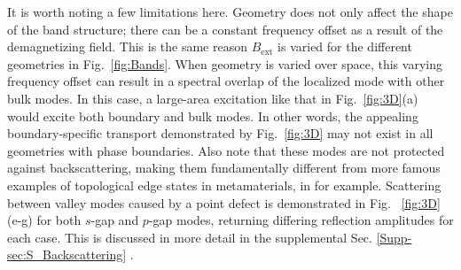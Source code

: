 \documentclass[aps,prx,twocolumn,superscriptaddress,floatfix]{revtex4-2}
\begin{document}
It is worth noting a few limitations here. Geometry does not only affect the shape of the band structure; there can be a constant frequency offset as a result of the demagnetizing field. This is the same reason $B_{\text{ext}}$ is varied for the different geometries in Fig.~\ref{fig:Bands}. When geometry is varied over space, this varying frequency offset can result in a spectral overlap of the localized mode with other bulk modes. In this case, a large-area excitation like that in Fig.~\ref{fig:3D}(a) would excite both boundary and bulk modes. In other words, the appealing boundary-specific transport demonstrated by Fig.~\ref{fig:3D} may not exist in all geometries with phase boundaries. Also note that these modes are not protected against backscattering, making them fundamentally different from more famous examples of topological edge states in metamaterials, in \cite{shindou_topological_2013,hafezi_imaging_2013} for example. Scattering between valley modes caused by a point defect is demonstrated in Fig. ~\ref{fig:3D}(e-g) for both $s$-gap and $p$-gap modes, returning differing reflection amplitudes for each case. This is discussed in more detail in the supplemental Sec. \ref{Supp-sec:S_Backscattering} \cite{Supplemental}.
\end{document}
